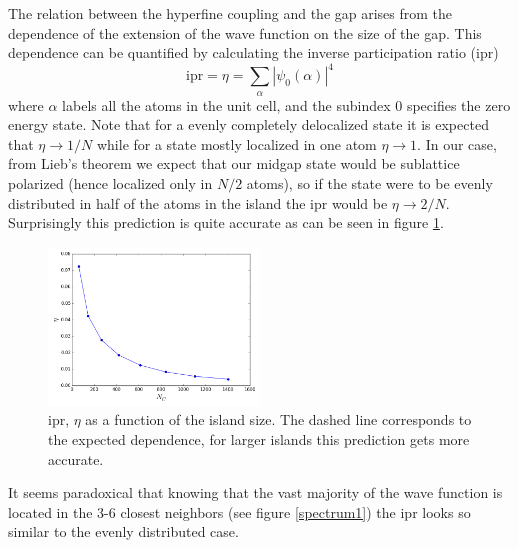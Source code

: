 





The relation between the hyperfine coupling and the gap arises from the dependence of the extension of the  wave function on the size of the gap. This dependence can be quantified by calculating the inverse participation ratio (ipr)
\begin{equation}
  \text{ipr} = \eta = \displaystyle\sum_{\alpha}|\psi_{0}(\alpha)|^4
\end{equation}
where $\alpha$ labels all the atoms  in the unit cell, and the subindex $0$ specifies the zero energy state. Note that for a evenly completely delocalized state it is expected that $\eta\rightarrow1/N$ while for a state mostly localized in one atom $\eta\rightarrow1$. In our case, from Lieb's theorem we expect that our midgap state would be sublattice polarized (hence localized only in $N/2$ atoms), so if the state were to be evenly distributed in half of the atoms in the island the ipr would be $\eta\rightarrow2/N$. Surprisingly this prediction is quite accurate as can be seen in figure \ref{ipr}.
\begin{figure}
\centering
\includegraphics[width=0.5\textwidth]{chapter05/figures/ipr.png}
\caption{ ipr, $\eta$ as a function of the island size. The dashed line corresponds to the expected dependence, for larger islands this prediction gets more accurate.}
\label{ipr}
\end{figure}
\FloatBarrier
It seems paradoxical that knowing that the vast majority of the wave function is located in the 3-6 closest neighbors (see figure \ref{spectrum1}) the ipr looks so similar to the evenly distributed case.


